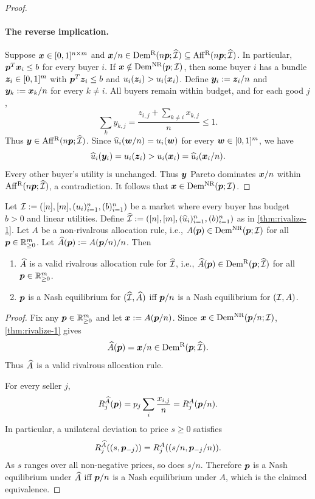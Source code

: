 \begin{proof}
\paragraph{The reverse implication.}
Suppose $\bm{x} \in [0,1]^{n\times m}$ and
$\bm{x}/n \in \operatorname{Dem^{\mathrm{R}}}(n\bm{p};\widehat{\mathcal{I}})\subseteq\operatorname{Aff^{\mathrm{R}}}(n\bm{p};\widehat{\mathcal{I}})$.
In particular, $\bm{p}^T\bm{x}_i\le b$ for every buyer $i$.
If $\bm{x}\notin\operatorname{Dem^{\mathrm{NR}}}(\bm{p};\mathcal{I})$, then some buyer $i$ has a bundle
$\bm{z}_i \in [0,1]^m$ with $\bm{p}^T\bm{z}_i\le b$ and $u_i(\bm{z}_i)>u_i(\bm{x}_i)$.
Define $\bm{y}_i:=\bm{z}_i/n$ and $\bm{y}_k:=\bm{x}_k/n$ for every $k\ne i$.
All buyers remain within budget, and for each good $j$,
\[ \sum_k y_{k,j}=\frac{z_{i,j}+\sum_{k\ne i}x_{k,j}}{n}\le1. \]
Thus $\bm{y} \in \operatorname{Aff^{\mathrm{R}}}(n\bm{p};\widehat{\mathcal{I}})$.
Since $\widehat{u}_i(\bm{w}/n)=u_i(\bm{w})$ for every $\bm{w} \in [0,1]^m$, we have
\[ \widehat{u}_i(\bm{y}_i)=u_i(\bm{z}_i)>u_i(\bm{x}_i)=\widehat{u}_i(\bm{x}_i/n). \]
Every other buyer's utility is unchanged. Thus $\bm{y}$ Pareto dominates $\bm{x}/n$
within $\operatorname{Aff^{\mathrm{R}}}(n\bm{p};\widehat{\mathcal{I}})$, a contradiction.
It follows that $\bm{x} \in \operatorname{Dem^{\mathrm{NR}}}(\bm{p};\mathcal{I})$.
\end{proof}

\begin{theorem}
\label{thm:rivalize-2}
Let $\mathcal{I} := ([n], [m], (u_i)_{i=1}^n, (b)_{i=1}^n)$ be a market
where every buyer has budget $b > 0$ and linear utilities.
Define $\widehat{\mathcal{I}} := ([n], [m], (\widehat{u}_i)_{i=1}^n, (b)_{i=1}^n)$ as in \cref{thm:rivalize-1}.
Let $A$ be a non-rivalrous allocation rule, i.e.,
$A(\bm{p}) \in \operatorname{Dem^{\mathrm{NR}}}(\bm{p}; \mathcal{I})$ for all $\bm{p} \in \mathbb{R}_{\ge 0}^m$.
Let $\widehat{A}(\bm{p}) := A(\bm{p}/n)/n$. Then
\begin{enumerate}
\item $\widehat{A}$ is a valid rivalrous allocation rule for $\widehat{\mathcal{I}}$,
    i.e., $\widehat{A}(\bm{p}) \in \operatorname{Dem^{\mathrm{R}}}(\bm{p}; \widehat{\mathcal{I}})$ for all $\bm{p} \in \mathbb{R}_{\ge 0}^m$.
\item $\bm{p}$ is a Nash equilibrium for $(\widehat{\mathcal{I}}, \widehat{A})$
    iff $\bm{p}/n$ is a Nash equilibrium for $(\mathcal{I}, A)$.
\end{enumerate}
\end{theorem}
\begin{proof}
Fix any $\bm{p} \in \mathbb{R}_{\ge0}^m$ and let $\bm{x}:= A(\bm{p}/n)$.
Since $\bm{x} \in \operatorname{Dem^{\mathrm{NR}}}(\bm{p}/n;\mathcal{I})$, \cref{thm:rivalize-1} gives
\[ \widehat{A}(\bm{p})=\bm{x}/n \in \operatorname{Dem^{\mathrm{R}}}(\bm{p};\widehat{\mathcal{I}}). \]
Thus $\widehat{A}$ is a valid rivalrous allocation rule.

For every seller $j$,
\[ R_j^{\widehat{A}}(\bm{p})
    =p_j\sum_i\frac{x_{i,j}}{n}
    =R_j^A(\bm{p}/n). \]
In particular, a unilateral deviation to price $s\ge0$ satisfies
\[ R_j^{\widehat{A}}((s,\bm{p}_{-j})) = R_j^A((s/n,\bm{p}_{-j}/n)). \]
As $s$ ranges over all non-negative prices, so does $s/n$.
Therefore $\bm{p}$ is a Nash equilibrium under $\widehat{A}$ iff $\bm{p}/n$ is a Nash equilibrium under $A$,
which is the claimed equivalence.
\end{proof}


